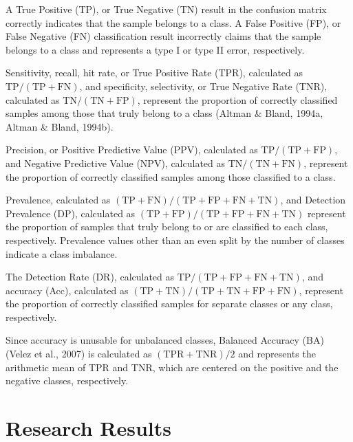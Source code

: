 \documentclass[sn-mathphys-num]{sn-jnl}%
\begin{document}
A True Positive (TP), or True Negative (TN) result in the confusion matrix correctly indicates that the sample belongs to a class. A False Positive (FP), or False Negative (FN) classification result incorrectly claims that the sample belongs to a class and represents a type I or type II error, respectively.

Sensitivity, recall, hit rate, or True Positive Rate (TPR), calculated as $\mathrm{TP}/(\mathrm{TP}+\mathrm{FN})$, and specificity, selectivity, or True Negative Rate (TNR), calculated as $\mathrm{TN}/(\mathrm{TN}+\mathrm{FP})$, represent the proportion of correctly classified samples among those that truly belong to a class (Altman & Bland, 1994a, Altman & Bland, 1994b).

Precision, or Positive Predictive Value (PPV), calculated as $\mathrm{TP}/(\mathrm{TP}+\mathrm{FP})$, and Negative Predictive Value (NPV), calculated as $\mathrm{TN}/(\mathrm{TN}+\mathrm{FN})$, represent the proportion of correctly classified samples among those classified to a class.

Prevalence, calculated as $(\mathrm{TP}+\mathrm{FN})/(\mathrm{TP}+\mathrm{FP}+\mathrm{FN}+\mathrm{TN})$, and Detection Prevalence (DP), calculated as $(\mathrm{TP}+\mathrm{FP})/(\mathrm{TP}+\mathrm{FP}+\mathrm{FN}+\mathrm{TN})$ represent the proportion of samples that truly belong to or are classified to each class, respectively. Prevalence values other than an even split by the number of classes indicate a class imbalance.

The Detection Rate (DR), calculated as $\mathrm{TP}/(\mathrm{TP}+\mathrm{FP}+\mathrm{FN}+\mathrm{TN})$, and accuracy (Acc), calculated as $(\mathrm{TP} + \mathrm{TN}) / (\mathrm{TP} + \mathrm{TN} + \mathrm{FP} + \mathrm{FN})$, represent the proportion of correctly classified samples for separate classes or any class, respectively.

Since accuracy is unusable for unbalanced classes, Balanced Accuracy (BA)  (Velez et al., 2007) is calculated as $(\mathrm{TPR} + \mathrm{TNR}) / 2$ and represents the arithmetic mean of TPR and TNR, which are centered on the positive and the negative classes, respectively.

\section{Research Results}
\label{sec:Results}
\end{document}
